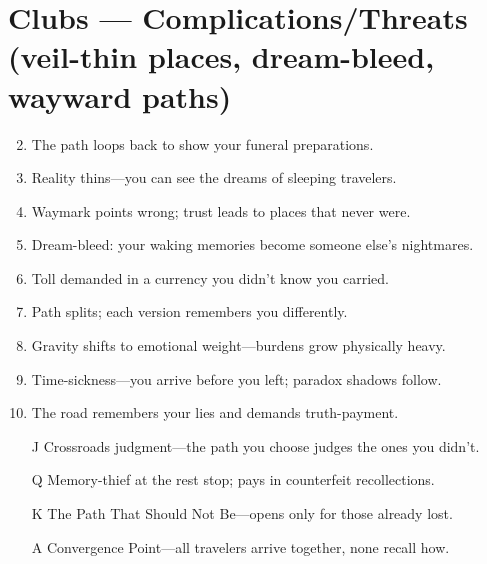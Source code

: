 \section*{Clubs --- Complications/Threats (veil-thin places, dream-bleed, wayward paths)}
\label{sec:ways-between-complications}
\begin{enumerate}
\setcounter{enumi}{1}
\item The path loops back to show your funeral preparations.
\item Reality thins---you can see the dreams of sleeping travelers.
\item Waymark points wrong; trust leads to places that never were.
\item Dream-bleed: your waking memories become someone else's nightmares.
\item Toll demanded in a currency you didn't know you carried.
\item Path splits; each version remembers you differently.
\item Gravity shifts to emotional weight---burdens grow physically heavy.
\item Time-sickness---you arrive before you left; paradox shadows follow.
\item The road remembers your lies and demands truth-payment.
\item[J] Crossroads judgment---the path you choose judges the ones you didn't.
\item[Q] Memory-thief at the rest stop; pays in counterfeit recollections.
\item[K] The Path That Should Not Be---opens only for those already lost.
\item[A] Convergence Point---all travelers arrive together, none recall how.
\end{enumerate}

